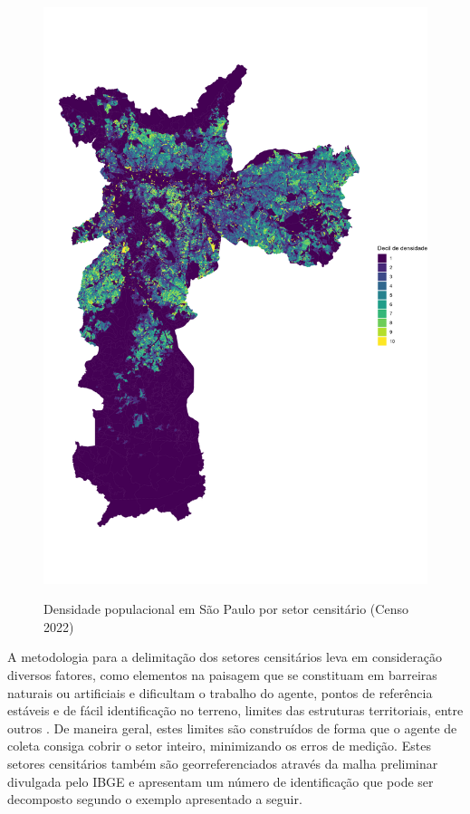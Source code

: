 \begin{figure}[!h]
    \centering
    \caption{Densidade populacional em São Paulo por setor censitário (Censo 2022)}
    \includegraphics[width = .85\linewidth]{imagens/mapa.png}
    \label{fig:populacao}
\end{figure}

A metodologia para a delimitação dos setores censitários leva em consideração diversos fatores, como elementos na paisagem que se constituam em barreiras naturais ou artificiais e dificultam o trabalho do agente, pontos de referência estáveis e de fácil identificação no terreno, limites das estruturas territoriais, entre outros \cite{IBGE2024}. De maneira geral, estes limites são construídos de forma que o agente de coleta consiga cobrir o setor inteiro, minimizando os erros de medição. Estes setores censitários também são georreferenciados através da malha preliminar divulgada pelo IBGE e apresentam um número de identificação que pode ser decomposto segundo o exemplo apresentado a seguir.

